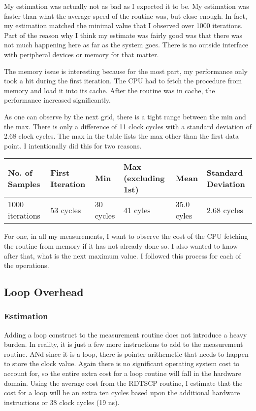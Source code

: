 \documentclass[paper=a4, fontsize=11pt]{scrartcl}
\numberwithin{equation}{section}		%
\numberwithin{figure}{section}			%
\numberwithin{table}{section}				%
\begin{document}
My estimation was actually not as bad as I expected it to be.  My estimation was faster than what the average speed of the routine was, but close enough.  In fact, my estimation matched the minimal value that I observed over 1000 iterations.  Part of the reason why I think my estimate was fairly good was that there was not much happening here as far as the system goes.  There is no outside interface with peripheral devices or memory for that matter.

The memory issue is interesting because for the most part, my performance only took a hit during the first iteration.  The CPU had to fetch the procedure from memory and load it into its cache.  After the routine was in cache, the performance increased significantly.

As one can observe by the next grid, there is a tight range between the min and the max.  There is only a difference of 11 clock cycles with a standard deviation of 2.68 clock cycles.  The max in the table lists the max other than the first data point.  I intentionally did this for two reasons.

\begin{center}
    \begin{tabular}{ | l | l | l | l | l | l |}
    \hline
    No. of Samples & First Iteration & Min & Max (excluding 1st) & Mean & Standard Deviation \\ \hline
    1000 iterations & 53 cycles & 30 cycles & 41 cyles & 35.0 cyles & 2.68 cycles \\ 
    \hline
    \end{tabular}
\end{center}

For one, in all my measurements, I want to observe the cost of the CPU fetching the routine from memory if it has not already done so.  I also wanted to know after that, what is the next maximum value.  I followed this process for each of the operations.

\subsection{Loop Overhead}

\subsubsection{Estimation}

Adding a loop construct to the measurement routine does not introduce a heavy burden.  In reality, it is just a few more instructions to add to the measurement routine.  ANd since it is a loop, there is pointer arithemetic that needs to happen to store the clock value.  Again there is no significant operating system cost to account for, so the entire extra cost for a loop routine will fall in the hardware domain.  Using the average cost from the RDTSCP routine, I estimate that the cost for a loop will be an extra ten cycles based upon the additional hardware instructions or 38 clock cycles (19 ns).
\end{document}
